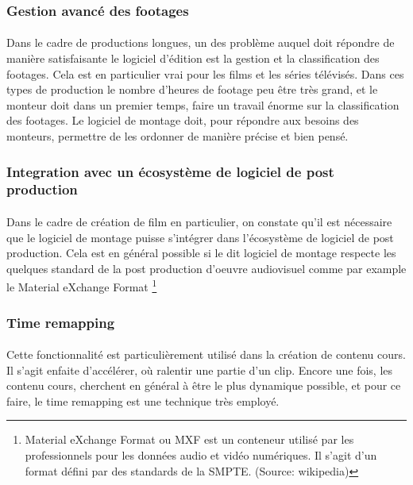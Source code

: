     \subsubsection{Gestion avancé des footages}
      \paragraph{}
        Dans le cadre de productions longues, un des problème auquel doit répondre de
        manière satisfaisante le logiciel d'édition est la gestion et la classification
        des footages. Cela est en particulier vrai pour les films et les séries télévisés.
        Dans ces types de production le nombre d'heures de footage peu être très grand, et
        le monteur doit dans un premier temps, faire un travail énorme sur la classification
        des footages. Le logiciel de montage doit, pour répondre aux besoins des monteurs,
        permettre de les ordonner de manière précise et bien pensé.

    \subsubsection{Integration avec un écosystème de logiciel de post production}
      \paragraph{}
        Dans le cadre de création de film en particulier, on constate qu'il est nécessaire
        que le logiciel de montage puisse s'intégrer dans l'écosystème de logiciel de post
        production. Cela est en général possible si le dit logiciel de montage respecte les
        quelques standard de la post production d'oeuvre audiovisuel comme par example le
        Material eXchange Format \footnote{Material eXchange Format ou MXF est un conteneur
        utilisé par les professionnels pour les données audio et vidéo numériques.
        Il s'agit d'un format défini par des standards de la SMPTE. (Source: wikipedia)}

    \subsubsection{Time remapping}
      \paragraph{ }
        Cette fonctionnalité est particulièrement utilisé dans la création de contenu cours.
        Il s'agit enfaite d'accélérer, où ralentir une partie d'un clip. Encore une fois,
        les contenu cours, cherchent en général à être le plus dynamique possible, et pour
        ce faire, le time remapping est une technique très employé.


